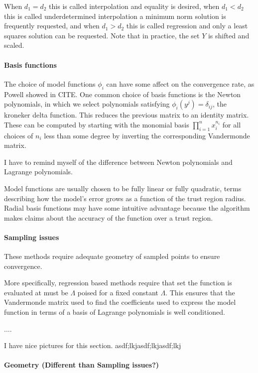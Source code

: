 \documentclass{article}
\begin{document}
When $d_1 = d_2$ this is called interpolation and equality is desired, when $d_1 < d_2$ this is called underdetermined interpolation a minimum norm solution is frequently requested, and when $d_1 > d_2$ this is called regression and only a least squares solution can be requested.
Note that in practice, the set $Y$ is shifted and scaled.

\paragraph{Basis functions}

The choice of model functions $\phi_i$ can have some affect on the convergence rate, as Powell showed in CITE.
One common choice of basis functions is the Newton polynomials, in which we select polynomials satisfying $\phi_{i}(y^j) = \delta_{ij}$, the kroneker delta function.
This reduces the previous matrix to an identity matrix.
These can be computed by starting with the monomial basis $\prod_{i=1}^{n} x_i^{n_i}$ for all choices of $n_i$ less than some degree by
inverting the corresponding Vandermonde matrix.

I have to remind myself of the difference between Newton polynomials and Lagrange polynomials.


Model functions are usually chosen to be fully linear or fully quadratic, terms describing how the model's error grows as a function of the trust region radius.
Radial basis functions may have some intuitive advantage because the algorithm makes claims about the accuracy of the function over a trust region.

\paragraph{Sampling issues}

These methods require adequate geometry of sampled points to ensure convergence.

More specifically, regression based methods require that set the function is evaluated at must be $\Lambda$ poised for a fixed constant $\Lambda$.
This ensures that the Vandermonde matrix used to find the coefficients used to express the model function in terms of a basis of Lagrange polynomials is well conditioned.

$\dots$.

I have nice pictures for this section.
asdf;lkjasdf;lkjasdf;lkj

\paragraph{Geometry (Different than Sampling issues?)}
\end{document}
